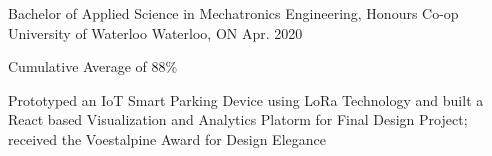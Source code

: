
\begin{cventries}
  \cventry
    {Bachelor of Applied Science in Mechatronics Engineering, Honours Co-op} %
    {University of Waterloo} %
    {Waterloo, ON} %
    {Apr. 2020} %
    {
      \begin{cvitems} %
         \item {Cumulative Average of 88\%}
         \vspace{0.5mm}
         \item {Prototyped an IoT Smart Parking Device using LoRa Technology and built a React based Visualization and Analytics Platorm for Final Design Project; received the Voestalpine Award for Design Elegance}
      \end{cvitems}
    }
\end{cventries}
